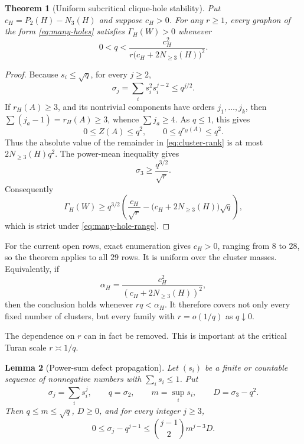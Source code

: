 \documentclass[11pt]{article}
\newtheorem{theorem}{Theorem}[section]
\newtheorem{lemma}[theorem]{Lemma}
\newcommand{\Gap}{\Gamma_H}
\begin{document}
\begin{theorem}[Uniform subcritical clique-hole stability]
Put $c_H=P_2(H)-N_3(H)$ and suppose $c_H>0$.  For any $r\geq1$, every
graphon of the form \eqref{eq:many-holes} satisfies $\Gap(W)>0$ whenever
\begin{equation}
 0<q<\frac{c_H^2}
 {r\bigl(c_H+2N_{\geq3}(H)\bigr)^2}.
 \label{eq:many-hole-range}
\end{equation}
\end{theorem}

\begin{proof}
Because $s_i\leq\sqrt q$, for every $j\geq2$,
\[
 \sigma_j=\sum_i s_i^2s_i^{j-2}\leq q^{j/2}.
\]
If $r_H(A)\geq3$, and its nontrivial components have orders
$j_1,\ldots,j_k$, then
$\sum(j_a-1)=r_H(A)\geq3$, whence $\sum j_a\geq4$.  As $q\leq1$, this gives
\[
 0\leq Z(A)\leq q^2,
 \qquad 0\leq q^{r_H(A)}\leq q^2.
\]
Thus the absolute value of the remainder in
\eqref{eq:cluster-rank} is at most $2N_{\geq3}(H)q^2$.  The power-mean
inequality gives
\[
 \sigma_3\geq\frac{q^{3/2}}{\sqrt r}.
\]
Consequently
\[
 \Gap(W)\geq
 q^{3/2}\left(
 \frac{c_H}{\sqrt r}
 -\bigl(c_H+2N_{\geq3}(H)\bigr)\sqrt q
 \right),
\]
which is strict under \eqref{eq:many-hole-range}.
\end{proof}

For the current open rows, exact enumeration gives $c_H>0$, ranging from
$8$ to $28$, so the theorem applies to all $29$ rows.  It is uniform over
the cluster masses.  Equivalently, if
\[
 \alpha_H=\frac{c_H^2}{(c_H+2N_{\geq3}(H))^2},
\]
then the conclusion holds whenever $rq<\alpha_H$.  It therefore covers not
only every fixed number of clusters, but every family with
$r=o(1/q)$ as $q\downarrow0$.

The dependence on $r$ can in fact be removed.  This is important at the
critical Turan scale $r\asymp1/q$.

\begin{lemma}[Power-sum defect propagation]\label{lem:defect}
Let $(s_i)$ be a finite or countable sequence of nonnegative numbers with
$\sum_i s_i\leq1$.  Put
\[
 \sigma_j=\sum_i s_i^j,\qquad q=\sigma_2,\qquad
 m=\sup_i s_i,\qquad D=\sigma_3-q^2.
\]
Then $q\leq m\leq\sqrt q$, $D\geq0$, and for every integer $j\geq3$,
\begin{equation}
 0\leq \sigma_j-q^{j-1}
 \leq \binom{j-1}{2}m^{j-3}D.
 \label{eq:defect}
\end{equation}
\end{lemma}
\end{document}
